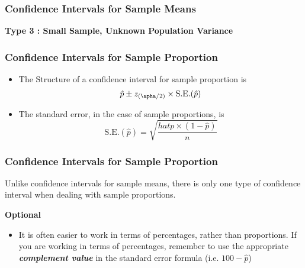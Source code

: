 \begin{frame}
\frametitle{Confidence Intervals for Sample Means}
\textbf{Type 3 : Small Sample, Unknown Population Variance}\\

\begin{frame}
\frametitle{Confidence Intervals for Sample Proportion}

\begin{itemize}
\item The Structure of a confidence interval for sample proportion is 
\[ \hat{p} \pm z_{(\apha/2)} \times \mbox{S.E.}(\hat{p})\]

\item The standard error, in the case of sample proportions, is
\[ \mbox{S.E.}(\hat{p}) = \sqrt{\frac{hat{p}\times (1-\hat{p})}{n}}\]

\end{itemize}
\end{frame}

\begin{frame}
\frametitle{Confidence Intervals for Sample Proportion}
Unlike confidence intervals for sample means, there is only one type of confidence interval when dealing with sample proportions.

\textbf{Optional}
\begin{itemize}

\item It is often easier to work in terms of percentages, rather than proportions.
If you are working in terms of percentages, remember to use the appropriate \textbf{\textit{complement value}} in the standard error formula (i.e. $100 - $) 


\end{itemize}
\end{frame}
\end{frame}
